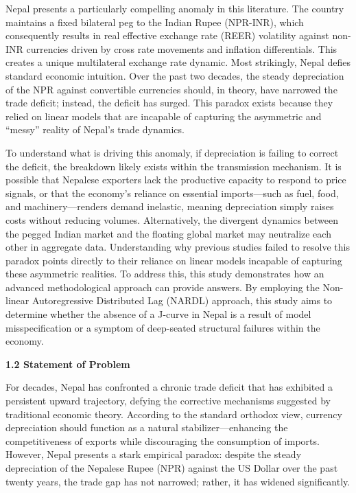 \documentclass[12pt]{article}
\begin{document}
Nepal presents a particularly compelling anomaly in this literature. The country maintains a fixed bilateral peg to the Indian Rupee (NPR-INR), which consequently results in real effective exchange rate (REER) volatility against non-INR currencies driven by cross rate movements and inflation differentials. This creates a unique multilateral exchange rate dynamic. Most strikingly, Nepal defies standard economic intuition. Over the past two decades, the steady depreciation of the NPR against convertible currencies should, in theory, have narrowed the trade deficit; instead, the deficit has surged. This paradox exists because they relied on linear models that are incapable of capturing the asymmetric and ``messy'' reality of Nepal’s trade dynamics.

To understand what is driving this anomaly, if depreciation is failing to correct the deficit, the breakdown likely exists within the transmission mechanism. It is possible that Nepalese exporters lack the productive capacity to respond to price signals, or that the economy’s reliance on essential imports—such as fuel, food, and machinery—renders demand inelastic, meaning depreciation simply raises costs without reducing volumes. Alternatively, the divergent dynamics between the pegged Indian market and the floating global market may neutralize each other in aggregate data. Understanding why previous studies failed to resolve this paradox points directly to their reliance on linear models incapable of capturing these asymmetric realities. To address this, this study demonstrates how an advanced methodological approach can provide answers. By employing the Non-linear Autoregressive Distributed Lag (NARDL) approach, this study aims to determine whether the absence of a J-curve in Nepal is a result of model misspecification or a symptom of deep-seated structural failures within the economy.

\vspace{0.5cm}
\noindent\textbf{1.2 Statement of Problem}

For decades, Nepal has confronted a chronic trade deficit that has exhibited a persistent upward trajectory, defying the corrective mechanisms suggested by traditional economic theory. According to the standard orthodox view, currency depreciation should function as a natural stabilizer—enhancing the competitiveness of exports while discouraging the consumption of imports. However, Nepal presents a stark empirical paradox: despite the steady depreciation of the Nepalese Rupee (NPR) against the US Dollar over the past twenty years, the trade gap has not narrowed; rather, it has widened significantly.
\end{document}
